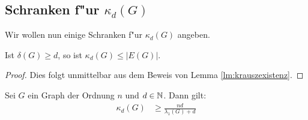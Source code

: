   \subsection{Schranken f"ur $\kappa_d(G)$}

  Wir wollen nun einige Schranken f"ur $\kappa_{d}(G)$ angeben. 
  \begin{lemma}
    Ist $\delta(G) \geq d$, so ist $\kappa_{d}(G) \leq |E(G)|$. 
  \end{lemma}
  \begin{proof}
    Dies folgt unmittelbar aus dem Beweis von Lemma \ref{lm:krauszexistenz}. 
  \end{proof}

  \begin{theorem}
    Sei $G$ ein Graph der Ordnung $n$ und $d\in {\mathbb{N}}$. Dann gilt:
    \begin{align*}
      \kappa_{d}(G) &\geq \frac{nd}{\lambda_{1}(G) +d} 
    \end{align*}
    \label{thm:kappaineq1}
  \end{theorem}

